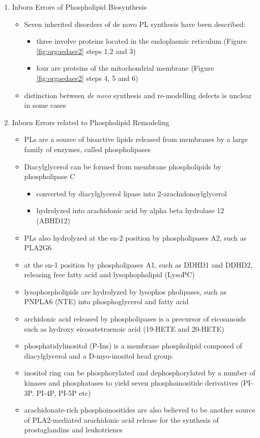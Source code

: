 \documentclass{scrartcl}
\begin{document}
\begin{enumerate}
\item Inborn Errors of Phospholipid Biosynthesis
\label{sec:org1edd885}
\begin{itemize}
\item Seven inherited disorders of de novo PL synthesis have been described:
\begin{itemize}
\item three involve proteins located in the endoplasmic reticulum
(Figure \ref{fig:orgaedaee2} steps 1,2 and 3)
\item four are proteins of the mitochondrial membrane (Figure
\ref{fig:orgaedaee2} steps 4, 5 and 6)
\end{itemize}
\item distinction between \emph{de novo} synthesis and re-modelling defects is
unclear in some cases
\end{itemize}

\item Inborn Errors related to Phospholipid Remodeling
\label{sec:orgfc9598e}
\begin{itemize}
\item PLs are a source of bioactive lipids released from
membranes by a large family of enzymes, called phospholipases
\item Diacylglycerol can be formed from membrane phospholipids by
phospholipase C
\begin{itemize}
\item converted by diacylglycerol lipase into 2-arachidonoylglycerol
\item hydrolyzed into arachidonic acid by alpha beta hydrolase 12 (ABHD12)
\end{itemize}
\item PLs also hydrolyzed at the sn-2 position by phospholipases A2, such
as PLA2G6
\item at the sn-1 position by phospholipases A1, such as DDHD1 and DDHD2,
releasing free fatty acid and lysophopholipid
(LysoPC)
\item lysophospholipids are hydrolyzed by lysophos pholipases, such as
PNPLA6 (NTE) into phosphoglycerol and fatty acid
\item archidonic acid released by phospholipases is a precursor of eicosanoids such as
hydroxy eicosatetraenoic acid (19-HETE and 20-HETE)
\item phosphatidylinositol (P-Ins) is a membrane phospholipid composed of
diacylglycerol and a D-myo-inositol head group.
\item inositol ring can be phosphorylated and dephosphorylated by a number
of kinases and phosphatases to yield seven phosphoinositide
derivatives (PI-3P, PI-4P, PI-5P etc)
\item arachidonate-rich phosphoinositides are also believed to be another
source of PLA2-mediated arachidonic acid release for the synthesis
of prostaglandins and leukotrienes
\end{itemize}
\end{enumerate}
\end{document}
